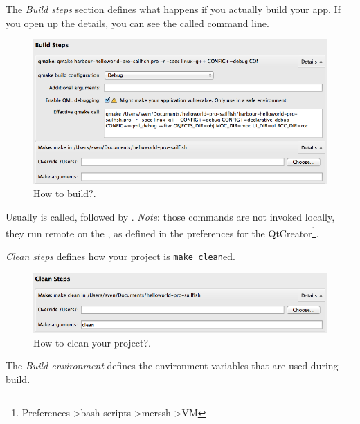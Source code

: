 The \emph{Build steps} section defines what happens if you actually build your app. If you open up the details, you can see the called command line.
%
\begin{figure}[H]
  \centering
  \includegraphics[scale=0.5]{../media/gfx/QtCreator/BuildSteps.png} 
  \caption{How to build?.}
  \label{fig:BuildSteps}
\end{figure}
%
Usually  is called, followed by . \emph{Note}: those commands are not invoked locally, they run remote on the , as defined in the preferences for the QtCreator\footnote{Preferences->bash scripts->merssh->VM}.

\emph{Clean steps} defines how your project is \verb,make clean,ed.
%
\begin{figure}[H]
  \centering
  \includegraphics[scale=0.5]{../media/gfx/QtCreator/CleanSteps.png} 
  \caption{How to clean your project?.}
  \label{fig:CleanSteps}
\end{figure}
%

The \emph{Build environment} defines the environment variables that are used during build.
%
%
